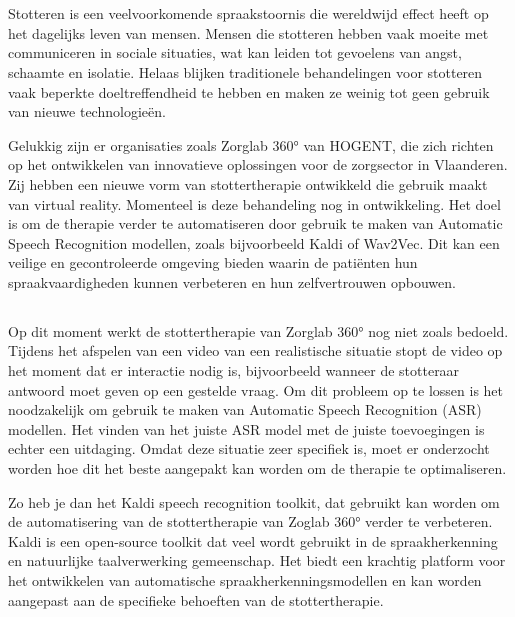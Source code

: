 
\chapter{}%
\label{ch:inleiding}
Stotteren is een veelvoorkomende spraakstoornis die wereldwijd effect heeft op het dagelijks leven van mensen. Mensen die stotteren hebben vaak moeite met communiceren in sociale situaties, wat kan leiden tot gevoelens van angst, schaamte en isolatie. Helaas blijken traditionele behandelingen voor stotteren vaak beperkte doeltreffendheid te hebben en maken ze weinig tot geen gebruik van nieuwe technologieën.\par

Gelukkig zijn er organisaties zoals Zorglab 360° van HOGENT, die zich richten op het ontwikkelen van innovatieve oplossingen voor de zorgsector in Vlaanderen. Zij hebben een nieuwe vorm van stottertherapie ontwikkeld die gebruik maakt van virtual reality. Momenteel is deze behandeling nog in ontwikkeling. Het doel is om de therapie verder te automatiseren door gebruik te maken van Automatic Speech Recognition modellen, zoals bijvoorbeeld Kaldi of Wav2Vec. Dit kan een veilige en gecontroleerde omgeving bieden waarin de patiënten hun spraakvaardigheden kunnen verbeteren en hun zelfvertrouwen opbouwen.
\section{}%
\label{sec:probleemstelling}
Op dit moment werkt de stottertherapie van Zorglab 360° nog niet zoals bedoeld. Tijdens het afspelen van een video van een realistische situatie stopt de video op het moment dat er interactie nodig is, bijvoorbeeld wanneer de stotteraar antwoord moet geven op een gestelde vraag. Om dit probleem op te lossen is het noodzakelijk om gebruik te maken van Automatic Speech Recognition (ASR) modellen. Het vinden van het juiste ASR model met de juiste toevoegingen is echter een uitdaging. Omdat deze situatie zeer specifiek is, moet er onderzocht worden hoe dit het beste aangepakt kan worden om de therapie te optimaliseren.\par

Zo heb je dan het Kaldi speech recognition toolkit, dat gebruikt kan worden om de automatisering van de stottertherapie van Zoglab 360° verder te verbeteren. Kaldi is een open-source toolkit dat veel wordt gebruikt in de spraakherkenning en natuurlijke taalverwerking gemeenschap. Het biedt een krachtig platform voor het ontwikkelen van automatische spraakherkenningsmodellen en kan worden aangepast aan de specifieke behoeften van de stottertherapie.\par

